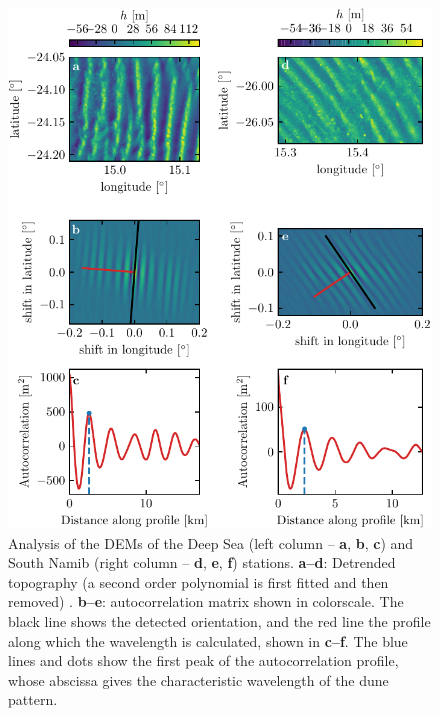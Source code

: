 \begin{figure}
  \centering
  \includegraphics[scale=1]{Figures/Figure4_supp.pdf}
  \caption{Analysis of the DEMs of the Deep Sea (left column -- \textbf{a}, \textbf{b}, \textbf{c}) and South Namib (right column -- \textbf{d}, \textbf{e}, \textbf{f}) stations. \textbf{a--d}: Detrended topography (a second order polynomial is first fitted and then removed) . \textbf{b--e}: autocorrelation matrix shown in colorscale. The black line shows the detected orientation, and the red line the profile along which the wavelength is calculated, shown in \textbf{c--f}. The blue lines and dots show the first peak of the autocorrelation profile, whose abscissa gives the characteristic wavelength of the dune pattern.}
  \label{Fig4_supp}
\end{figure}

